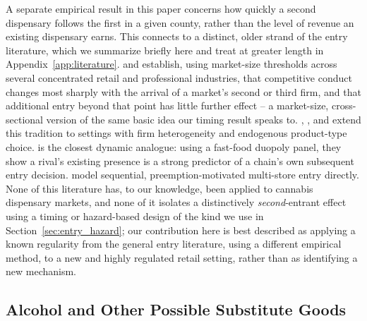 \documentclass[12pt]{article}
\begin{document}
A separate empirical result in this paper concerns how quickly a second dispensary follows the first in a
given county, rather than the level of revenue an existing dispensary earns. This connects to a distinct,
older strand of the entry literature, which we summarize briefly here and treat at greater length in
Appendix~\ref{app:literature}. \citet{BresnahanReiss1990} and \citet{BresnahanReiss1991} establish, using
market-size thresholds across several concentrated retail and professional industries, that competitive
conduct changes most sharply with the arrival of a market's second or third firm, and that additional entry
beyond that point has little further effect -- a market-size, cross-sectional version of the same basic
idea our timing result speaks to. \citet{Berry1992}, \citet{Mazzeo2002}, and \citet{Seim2006} extend this
tradition to settings with firm heterogeneity and endogenous product-type choice. \citet{ToivanenWaterson2005}
is the closest dynamic analogue: using a fast-food duopoly panel, they show a rival's existing presence is a
strong predictor of a chain's own subsequent entry decision. \citet{IgamiYang2016} model sequential,
preemption-motivated multi-store entry directly. None of this literature has, to our knowledge, been applied
to cannabis dispensary markets, and none of it isolates a distinctively \emph{second}-entrant effect using a
timing or hazard-based design of the kind we use in Section~\ref{sec:entry_hazard}; our contribution here is
best described as applying a known regularity from the general entry literature, using a different empirical
method, to a new and highly regulated retail setting, rather than as identifying a new mechanism.

\subsection{Alcohol and Other Possible Substitute Goods}
\end{document}

